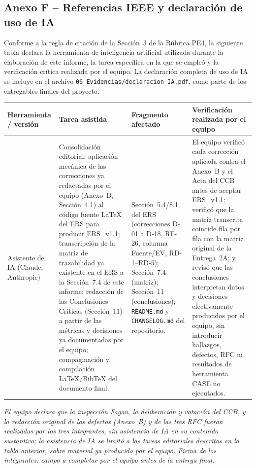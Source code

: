 \documentclass[11pt,a4paper]{article}
\begin{document}
\subsection*{Anexo F -- Referencias IEEE y declaración de uso de IA}

Conforme a la regla de citación de la Sección~3 de la Rúbrica PE4, la siguiente tabla declara la herramienta de inteligencia artificial utilizada durante la elaboración de este informe, la tarea específica en la que se empleó y la verificación crítica realizada por el equipo. La declaración completa de uso de IA se incluye en el archivo \texttt{06\_Evidencias/declaracion\_IA.pdf}, como parte de los entregables finales del proyecto.

\begin{longtable}{|p{3.2cm}|p{3.5cm}|p{3.8cm}|p{3.6cm}|}
\hline
\textbf{Herramienta / versión} & \textbf{Tarea asistida} & \textbf{Fragmento afectado} & \textbf{Verificación realizada por el equipo} \\
\hline
Asistente de IA (Claude, Anthropic) & Consolidación editorial: aplicación mecánica de las correcciones ya redactadas por el equipo (Anexo~B, Sección~4.1) al código fuente LaTeX del ERS para producir ERS\_v1.1; transcripción de la matriz de trazabilidad ya existente en el ERS a la Sección~7.4 de este informe; redacción de las Conclusiones Críticas (Sección~11) a partir de las métricas y decisiones ya documentadas por el equipo; compaginación y compilación LaTeX/BibTeX del documento final. & Sección~5.4/8.1 del ERS (correcciones D-01 a D-18, RF-26, columna Fuente/EV, RD-1--RD-5); Sección~7.4 (matriz); Sección~11 (conclusiones); \texttt{README.md} y \texttt{CHANGELOG.md} del repositorio. & El equipo verificó cada corrección aplicada contra el Anexo~B y el Acta del CCB antes de aceptar ERS\_v1.1; verificó que la matriz transcrita coincide fila por fila con la matriz original de la Entrega~2A; y revisó que las conclusiones interpretan datos y decisiones efectivamente producidos por el equipo, sin introducir hallazgos, defectos, RFC ni resultados de herramienta CASE no ejecutados. \\
\hline
\end{longtable}
\vspace{-0.3cm}
\textit{El equipo declara que la inspección Fagan, la deliberación y votación del CCB, y la redacción original de los defectos (Anexo~B) y de las tres RFC fueron realizadas por los tres integrantes, sin asistencia de IA en su contenido sustantivo; la asistencia de IA se limitó a las tareas editoriales descritas en la tabla anterior, sobre material ya producido por el equipo. Firma de los integrantes: campo a completar por el equipo antes de la entrega final.}

\newpage


\end{document}
